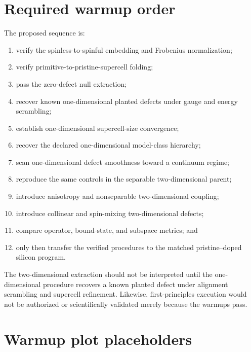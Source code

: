 \section*{Required warmup order}

The proposed sequence is:
\begin{enumerate}
    \item verify the spinless-to-spinful embedding and Frobenius normalization;
    \item verify primitive-to-pristine-supercell folding;
    \item pass the zero-defect null extraction;
    \item recover known one-dimensional planted defects under gauge and energy
          scrambling;
    \item establish one-dimensional supercell-size convergence;
    \item recover the declared one-dimensional model-class hierarchy;
    \item scan one-dimensional defect smoothness toward a continuum regime;
    \item reproduce the same controls in the separable two-dimensional parent;
    \item introduce anisotropy and nonseparable two-dimensional coupling;
    \item introduce collinear and spin-mixing two-dimensional defects;
    \item compare operator, bound-state, and subspace metrics; and
    \item only then transfer the verified procedures to the matched
          pristine--doped silicon program.
\end{enumerate}
The two-dimensional extraction should not be interpreted until the
one-dimensional procedure recovers a known planted defect under alignment
scrambling and supercell refinement. Likewise, first-principles execution would
not be authorized or scientifically validated merely because the warmups pass.

\section*{Warmup plot placeholders}

